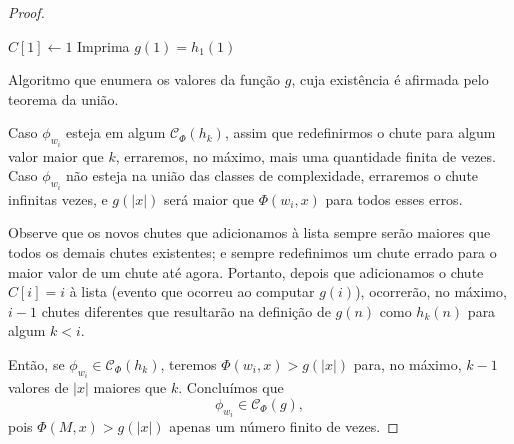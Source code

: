 \begin{proof}
    \begin{algorithm}[h]
        $C[1] \leftarrow 1$ \;
        Imprima $g(1) = h_1(1)$ \;
        \caption{
            Algoritmo que enumera os valores da função $g$,
            cuja existência é afirmada pelo teorema da união.
        }
        \label{algo:union_theorem}
    \end{algorithm}

    Caso $\phi_{w_i}$ esteja em algum $\mathcal C_\Phi(h_k)$,
    assim que redefinirmos o chute para algum valor maior que $k$,
    erraremos, no máximo,
    mais uma quantidade finita de vezes.
    Caso $\phi_{w_i}$ não esteja na união das classes de complexidade,
    erraremos o chute infinitas vezes,
    e $g(|x|)$ será maior que $\Phi(w_i, x)$ para todos esses erros.

    Observe que os novos chutes que adicionamos à lista
    sempre serão maiores que todos os demais chutes existentes;
    e sempre redefinimos um chute errado
    para o maior valor de um chute até agora.
    Portanto, depois que adicionamos o chute
    $C[i] = i$ à lista
    (evento que ocorreu ao computar $g(i)$),
    ocorrerão, no máximo,
    $i-1$ chutes diferentes
    que resultarão na definição de $g(n)$ como $h_k(n)$
    para algum $k < i$.

    Então, se $\phi_{w_i} \in \mathcal C_\Phi(h_k)$,
    teremos $\Phi(w_i, x) > g(|x|)$
    para, no máximo, $k-1$ valores de $|x|$ maiores que $k$.
    Concluímos que
    \begin{equation*}
        \phi_{w_i} \in \mathcal C_\Phi(g),
    \end{equation*}
    pois $\Phi(M, x) > g(|x|)$ apenas um número finito de vezes.


\end{proof}
